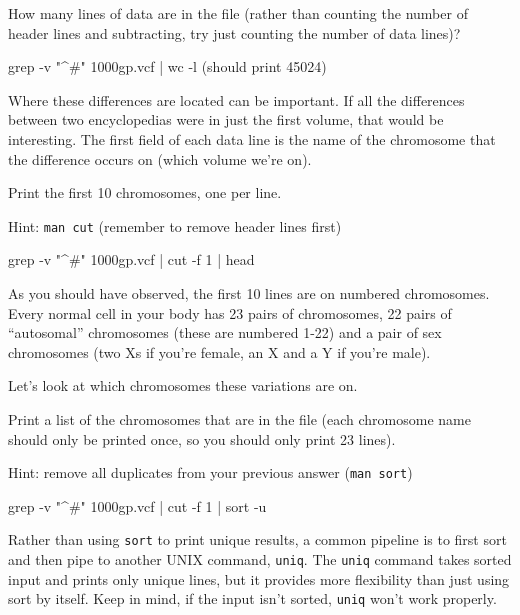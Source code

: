 \begin{questions}
How many lines of data are in the file (rather than counting the number of header lines and subtracting, try just counting the number of data lines)?
\begin{answer}
grep -v "^#" 1000gp.vcf | wc -l (should print 45024)
\end{answer}
\end{questions}

\begin{note}
Where these differences are located can be important. If all the differences between two encyclopedias were in just the first volume, that would be interesting. The first field of each data line is the name of the chromosome that the difference occurs on (which volume we're on). 
\end{note}

\begin{questions}
Print the first 10 chromosomes, one per line. 

Hint: \texttt{man cut} (remember to remove header lines first)
\begin{answer}
grep -v "^#" 1000gp.vcf | cut -f 1 | head
\end{answer}
\end{questions}

\begin{note}
As you should have observed, the first 10 lines are on numbered chromosomes. Every normal cell in your body has 23 pairs of chromosomes, 22 pairs of ``autosomal'' chromosomes (these are numbered 1-22) and a pair of sex chromosomes (two Xs if you're female, an X and a Y if you're male).

Let's look at which chromosomes these variations are on. 

\end{note}
\begin{questions}
Print a list of the chromosomes that are in the file (each chromosome name should only be printed once, so you should only print 23 lines).

Hint: remove all duplicates from your previous answer (\texttt{man sort})
\begin{answer}
grep -v "^#" 1000gp.vcf | cut -f 1 | sort -u
\end{answer}
\end{questions}

\begin{note}
Rather than using \texttt{sort} to print unique results, a common pipeline is to first sort and then pipe to another UNIX command, \texttt{uniq}. The \texttt{uniq} command takes sorted input and prints only unique lines, but it provides more flexibility than just using sort by itself. Keep in mind, if the input isn't sorted, \texttt{uniq} won't work properly.
\end{note}

